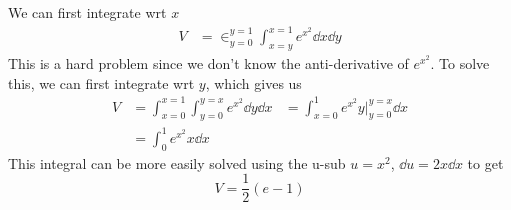 \begin{itemize}
\begin{example}
              We can first integrate wrt $x$
              \begin{align}
                  V & = \in_{y=0}^{y=1}\int_{x=y}^{x=1} e^{x^2}\dd{x}\dd{y}
              \end{align}
              This is a hard problem since we don't know the anti-derivative of $e^{x^2}$. To solve this, we can first integrate wrt $y$, which gives us
              \begin{align}
                  V & = \int_{x=0}^{x=1}\int_{y=0}^{y=x}e^{x^2}\dd{y}\dd{x} & = \int_{x=0}^1 e^{x^2}y\big\rvert_{y=0}^{y=x}\dd{x} \\
                    & = \int_0^1 e^{x^2}x\dd{x}
              \end{align}
              This integral can be more easily solved using the u-sub $u=x^2$, $\dd{u}=2x\dd{x}$ to get
              \begin{equation}
                  V = \frac{1}{2}(e-1)
              \end{equation}
          \end{example}
\end{itemize}